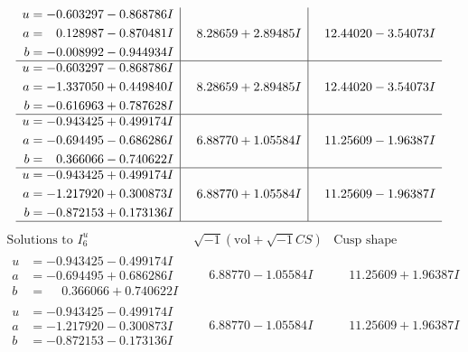 \documentclass[1p]{elsarticle_modified}
\theoremstyle{definition}
\newcommand{\I}{\sqrt{-1}}
\begin{document}
$$\begin{array}{c|c|c}
\begin{aligned}
u &= -0.603297 - 0.868786 I \\
a &= \phantom{-}0.128987 - 0.870481 I \\
b &= -0.008992 - 0.944934 I\end{aligned}
 & \phantom{-}8.28659 + 2.89485 I & \phantom{-}12.44020 - 3.54073 I \\ \hline\begin{aligned}
u &= -0.603297 - 0.868786 I \\
a &= -1.337050 + 0.449840 I \\
b &= -0.616963 + 0.787628 I\end{aligned}
 & \phantom{-}8.28659 + 2.89485 I & \phantom{-}12.44020 - 3.54073 I \\ \hline\begin{aligned}
u &= -0.943425 + 0.499174 I \\
a &= -0.694495 - 0.686286 I \\
b &= \phantom{-}0.366066 - 0.740622 I\end{aligned}
 & \phantom{-}6.88770 + 1.05584 I & \phantom{-}11.25609 - 1.96387 I \\ \hline\begin{aligned}
u &= -0.943425 + 0.499174 I \\
a &= -1.217920 + 0.300873 I \\
b &= -0.872153 + 0.173136 I\end{aligned}
 & \phantom{-}6.88770 + 1.05584 I & \phantom{-}11.25609 - 1.96387 I\\
 \hline 
 \end{array}$$\newpage$$\begin{array}{c|c|c}  
\text{Solutions to }I^u_{6}& \I (\text{vol} + \sqrt{-1}CS) & \text{Cusp shape}\\
 \hline 
\begin{aligned}
u &= -0.943425 - 0.499174 I \\
a &= -0.694495 + 0.686286 I \\
b &= \phantom{-}0.366066 + 0.740622 I\end{aligned}
 & \phantom{-}6.88770 - 1.05584 I & \phantom{-}11.25609 + 1.96387 I \\ \hline\begin{aligned}
u &= -0.943425 - 0.499174 I \\
a &= -1.217920 - 0.300873 I \\
b &= -0.872153 - 0.173136 I\end{aligned}
 & \phantom{-}6.88770 - 1.05584 I & \phantom{-}11.25609 + 1.96387 I \\ \hline\begin{aligned}

\end{aligned}
\end{array}$$
\end{document}
